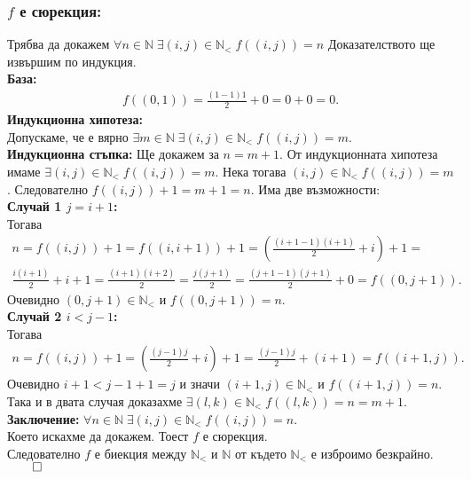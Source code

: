 \documentclass[a4paper, 12pt, oneside]{article}
\newcommand{\N}{\mathbb{N}}
\newcommand{\LN}{\N_<}
\begin{document}
\subsubsection*{\(f\) е сюрекция:}
Трябва да докажем \(\forall n \in \N \; \exists (i, j) \in \LN \; f((i, j)) = n\)
Доказателството ще извършим по индукция. \\
\textbf{База:} \\
\begin{align*}
    f((0, 1)) = \displaystyle\frac{(1 - 1)1}{2} + 0 = 0 + 0 = 0.
\end{align*}
\textbf{Индукционна хипотеза:} \\
Допускаме, че е вярно \(\exists m \in \N \; \exists (i, j) \in \LN \; f((i, j)) = m\). \\
\textbf{Индукционна стъпка:}
Ще докажем за \(n = m + 1\). От индукционната хипотеза имаме \(\exists (i, j) \in \LN \; f((i, j)) = m\).
Нека тогава \((i, j) \in \LN \; f((i, j)) = m\). Следователно \(f((i, j)) + 1 = m + 1 = n\).
Има две възможности: \\
\textbf{Случай 1 \(j = i + 1\):} \\
Тогава
\begin{align*}
    n = f((i, j)) + 1 = f((i, i + 1)) + 1 = \left(\displaystyle\frac{(i + 1 - 1)(i + 1)}{2} + i\right) + 1 = \\
    \displaystyle\frac{i(i + 1)}{2} + i + 1 = \displaystyle\frac{(i + 1)(i + 2)}{2} = \displaystyle\frac{j(j + 1)}{2} = \displaystyle\frac{(j + 1 - 1)(j + 1)}{2} + 0 = f((0, j + 1)).
\end{align*}
Очевидно \((0, j + 1) \in \LN\) и \(f((0, j + 1)) = n\). \\
\textbf{Случай 2 \(i < j - 1\):} \\
Тогава
\begin{align*}
    n = f((i, j)) + 1 = \left(\displaystyle\frac{(j - 1)j}{2} + i\right) + 1 = \displaystyle\frac{(j - 1)j}{2} + (i + 1) = f((i + 1, j)).
\end{align*}
Очевидно \(i + 1 < j - 1 + 1 = j\) и значи \((i + 1, j) \in \LN\) и \(f((i + 1, j)) = n\). \\
Така и в двата случая доказахме \(\exists (l, k) \in \LN \; f((l, k)) = n = m + 1\). \\
\textbf{Заключение:}
\(\forall n \in \N \; \exists (i, j) \in \LN \; f((i, j)) = n\). \\
Което искахме да докажем. Тоест \(f\) е сюрекция. \\
Следователно \(f\) е биекция между \(\LN\) и \(\N\) от където \(\LN\) е изброимо безкрайно. \(\qed\)
\end{document}
